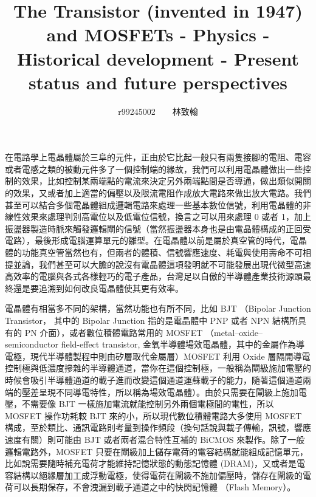 \documentclass[a4paper,12pt]{article}
\begin{document}
\author{r99245002~~~~林致翰}
\title{
The Transistor (invented in 1947) and MOSFETs - Physics - Historical development - Present status and future perspectives}

\maketitle

在電路學上電晶體屬於三阜的元件，正由於它比起一般只有兩隻接腳的電阻、電容或者電感之類的被動元件多了一個控制端的緣故，我們可以利用電晶體做出一些控制的效果，比如控制某兩端點的電流來決定另外兩端點間是否導通，做出類似開關的效果，又或者加上適當的偏壓以及限流電阻作成放大電路來做出放大電路。我們甚至可以結合多個電晶體組成邏輯電路來處理一些基本數位信號，利用電晶體的非線性效果來處理判別高電位以及低電位信號，換言之可以用來處理 0 或者 1，加上振盪器製造時脈來觸發邏輯閘的信號（當然振盪器本身也是由電晶體構成的正回受電路），最後形成電腦運算單元的雛型。在電晶體以前是屬於真空管的時代，電晶體的功能真空管當然也有，但兩者的體積、信號響應速度、耗電與使用壽命不可相提並論，我們甚至可以大膽的說沒有電晶體這項發明就不可能發展出現代微型高速高效率的電腦與各式各樣輕巧的電子產品，台灣足以自傲的半導體產業技術源頭最終還是要追溯到如何改良電晶體使其更有效率。

電晶體有相當多不同的架構，當然功能也有所不同，比如 BJT （Bipolar Junction Transistor， 其中的 Bipolar Junction 指的是電晶體中 PNP 或者 NPN 結構所具有的 PN 介面），或者數位積體電路常用的 MOSFET （metal–oxide–semiconductor field-effect transistor, 金氧半導體場效電晶體，其中的金屬作為導電極，現代半導體製程中則由矽層取代金屬層）MOSFET 利用 Oxide 層隔開導電控制極與低濃度摻雜的半導體通道，當你在這個控制極，一般稱為閘級施加電壓的時候會吸引半導體通道的載子進而改變這個通道運蘇載子的能力，隨著這個通道兩端的壓差呈現不同導電特性，所以稱為場效電晶體）。由於只需要在閘級上施加電壓，不需要像 BJT 一樣施加電流就能控制另外兩個電極間的電性，所以 MOSFET 操作功耗較 BJT 來的小，所以現代數位積體電路大多使用 MOSFET 構成，至於類比、通訊電路則考量到操作頻段（換句話說與載子傳輸，訊號，響應速度有關）則可能由 BJT 或者兩者混合特性互補的 BiCMOS 來製作。除了一般邏輯電路外，MOSFET 只要在閘級加上儲存電荷的電容結構就能組成記憶單元，比如說需要隨時補充電荷才能維持記憶狀態的動態記憶體 (DRAM)，又或者是電容結構以絕緣層加工成浮動電極，使得電荷在閘級不施加偏壓時，儲存在閘級的電荷可以長期保存，不會洩漏到載子通道之中的快閃記憶體 （Flash Memory）。
\end{document}

